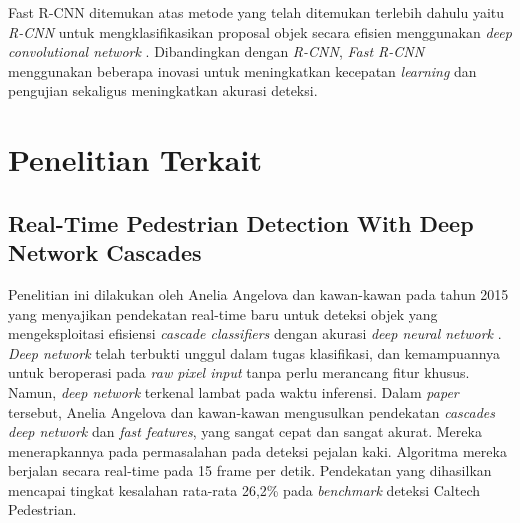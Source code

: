 Fast R-CNN ditemukan atas metode yang telah ditemukan terlebih dahulu yaitu \textit{R-CNN} untuk mengklasifikasikan proposal objek secara efisien menggunakan \textit{deep convolutional network} \citep{fast-rcnn}. Dibandingkan dengan \textit{R-CNN}, \textit{Fast R-CNN} menggunakan beberapa inovasi untuk meningkatkan kecepatan \textit{learning} dan pengujian sekaligus meningkatkan akurasi deteksi.

\section{Penelitian Terkait}
\label{penelitianterkait}

\subsection{Real-Time Pedestrian Detection With Deep Network Cascades}
\label{realtime pedestrian}

Penelitian ini dilakukan oleh Anelia Angelova dan kawan-kawan pada tahun 2015 yang menyajikan pendekatan real-time baru untuk deteksi objek yang mengeksploitasi efisiensi \textit{cascade classifiers} dengan akurasi \textit{deep neural network} \citep{penelitianterkait1}. \textit{Deep network} telah terbukti unggul dalam tugas klasifikasi, dan kemampuannya untuk beroperasi pada \textit{raw pixel input} tanpa perlu merancang fitur khusus. Namun, \textit{deep network} terkenal lambat pada waktu inferensi. Dalam \textit{paper} tersebut, Anelia Angelova dan kawan-kawan mengusulkan pendekatan \textit{cascades deep network} dan \textit{fast features}, yang sangat cepat dan sangat akurat. Mereka menerapkannya pada permasalahan pada deteksi pejalan kaki. Algoritma mereka berjalan secara real-time pada 15 frame per detik. Pendekatan yang dihasilkan mencapai tingkat kesalahan rata-rata 26,2\% pada \textit{benchmark} deteksi Caltech Pedestrian.